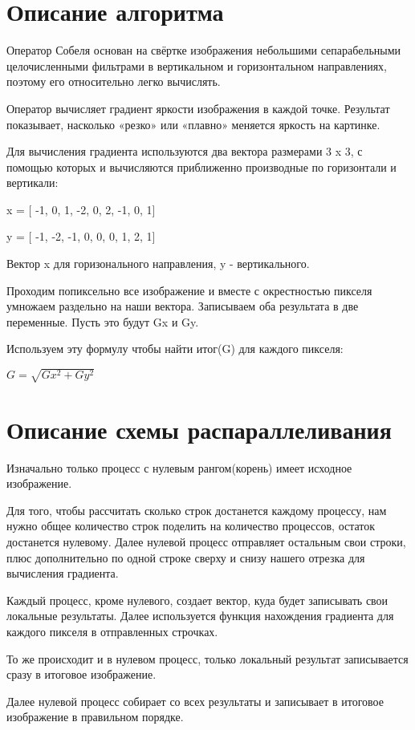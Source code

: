 \documentclass{report}
\begin{document}
	\section*{Описание алгоритма}
	Оператор Собеля основан на свёртке изображения небольшими сепарабельными целочисленными фильтрами в вертикальном и горизонтальном направлениях, поэтому его относительно легко вычислять. 
	\par Оператор вычисляет градиент яркости изображения в каждой точке.  Результат показывает, насколько «резко» или «плавно» меняется яркость на картинке. 
	\par Для вычисления градиента используются два вектора размерами 3 x 3, с помощью которых и вычисляются приближенно производные по горизонтали и вертикали:
	\par x = [ -1, 0, 1, -2, 0, 2, -1, 0, 1]
	\par y = [ -1, -2, -1, 0, 0, 0, 1, 2, 1]
	\par Вектор x для горизонального направления, y - вертикального.
	\par Проходим попиксельно все изображение и вместе с окрестностью пикселя умножаем раздельно на наши вектора. Записываем оба результата в две переменные. Пусть это будут Gx и Gy.
	\par Используем эту формулу чтобы найти итог(G) для каждого пикселя:
	\par $ G = \sqrt{Gx^2 + Gy^2}$
	\newpage

	\section*{Описание схемы распараллеливания}
	\par Изначально только процесс с нулевым рангом(корень) имеет исходное изображение. 
	\par Для того, чтобы рассчитать сколько строк достанется каждому процессу, нам нужно общее количество строк поделить на количество процессов, остаток достанется нулевому. Далее нулевой процесс отправляет остальным свои строки, плюс дополнительно по одной строке сверху и снизу нашего отрезка для вычисления градиента.
	\par Каждый процесс, кроме нулевого, создает вектор, куда будет записывать свои локальные результаты. Далее используется функция нахождения градиента для каждого пикселя в отправленных строчках.
	\par То же происходит и в нулевом процесс, только локальный результат записывается сразу в итоговое изображение. 
	\par Далее нулевой процесс собирает со всех результаты и записывает в итоговое изображение в правильном порядке.
	
\end{document}
